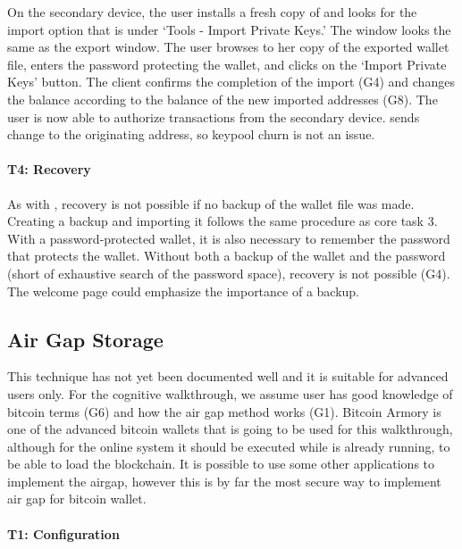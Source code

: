 On the secondary device, the user installs a fresh copy of \multibit and looks for the import option that is under `Tools - Import Private Keys.' The window looks the same as the export window. The user browses to her copy of the exported wallet file, enters the password protecting the wallet, and clicks on the `Import Private Keys' button. The client confirms the completion of the import (G4) and changes the balance according to the balance of the new imported addresses (G8). The user is now able to authorize transactions from the secondary device. \multibit sends change to the originating address, so keypool churn is not an issue.


\paragraph{T4: Recovery}

As with \bitcoinclient, recovery is not possible if no backup of the wallet file was made. Creating a backup and importing it follows the same procedure as core task 3. With a password-protected wallet, it is also necessary to remember the password that protects the wallet. Without both a backup of the wallet and the password (short of exhaustive search of the password space), recovery is not possible (G4). The welcome page could emphasize the importance of a backup.  


\subsection{Air Gap Storage}
\label{air gap}
This technique has not yet been documented well and it is suitable for advanced users only. For the cognitive walkthrough, we assume user has good knowledge of bitcoin terms (G6) and how the air gap method works (G1). Bitcoin Armory is one of the advanced bitcoin wallets that is going to be used for this walkthrough, although for the online system it should be executed while \bitcoinclient is already running, to be able to load the blockchain. It is possible to use some other applications to implement the airgap, however this is by far the most secure way to implement air gap for bitcoin wallet.

\paragraph{T1: Configuration} 

